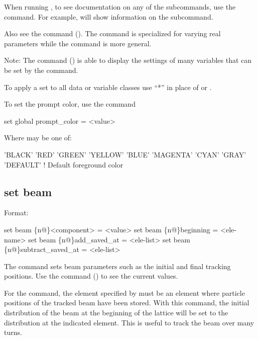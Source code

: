 {{\vskip 10pt 

When running \tao, to see documentation on any of the subcommands, use the  command. For example,  will show information on the  subcommand.

Also see the  command (). The  command is specialized for
varying real parameters while the  command is more general.

Note: The  command () is able to display the settings of many variables that
can be set by the  command.

To apply a set to all data or variable classes use ``*'' in place of  or .

To set the prompt color, use the command
\begin{example}
  set global prompt_color = <value>
\end{example}
Where  may be one of:
\begin{example}
  'BLACK'
  'RED'
  'GREEN'
  'YELLOW'
  'BLUE'
  'MAGENTA'
  'CYAN'
  'GRAY'
  'DEFAULT'       ! Default foreground color
\end{example}



\subsection{set beam}
\label{s:set.beam}

Format:
\begin{example}
  set beam \{n@\}<component> = <value>
  set beam \{n@\}beginning = <ele-name>
  set beam \{n@\}add_saved_at = <ele-list>
  set beam \{n@\}subtract_saved_at = <ele-list>
\end{example}

The  command sets beam parameters such as the initial and final tracking positions.
Use the  command () to see the current values.

For the  command, the element specified by  must be
an element where particle positions of the tracked beam have been stored. With this command, the
initial distribution of the beam at the beginning of the lattice will be set to the distribution at
the indicated element. This is useful to track the beam over many turns.

}}
